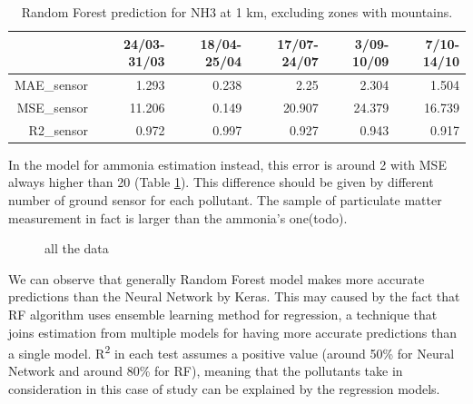 \begin{table}[H]
\begin{tabular}{rrrrrr}
\hline
     &   24/03-31/03 &   18/04-25/04 &   17/07-24/07 &   3/09-10/09 &   7/10-14/10 \\
\hline
  MAE\_sensor   &            1.293 &            0.238 &            2.25  &            2.304 &            1.504 \\
  MSE\_sensor   &           11.206 &            0.149 &           20.907 &           24.379 &           16.739 \\
  R2\_sensor    &            0.972 &            0.997 &            0.927 &            0.943 &            0.917 \\
\hline
\end{tabular}
\caption{Random Forest prediction for NH3 at 1 km, excluding zones with mountains.}
\label{tab:nh3}
\end{table}
In the model for ammonia estimation instead, this error is around 2 with MSE always higher than 20 (Table \ref{tab:nh3}).
This difference should be given by different number of ground sensor for each pollutant. The sample of particulate matter measurement in fact is larger than the ammonia's one(todo).
\begin{figure}[htp] 
    \centering
    \hfill%
    \caption{all the data}
\end{figure}

We can observe that generally Random Forest model makes more accurate predictions than the Neural Network by Keras. This may caused by the fact that RF algorithm uses ensemble learning method for regression, a technique that joins estimation from multiple models for having more accurate predictions than a single model. 
R\textsuperscript{2} in each test assumes a positive value (around 50\% for Neural Network and around 80\% for RF), meaning that the pollutants take in consideration in this case of study can be explained by the regression models. 
